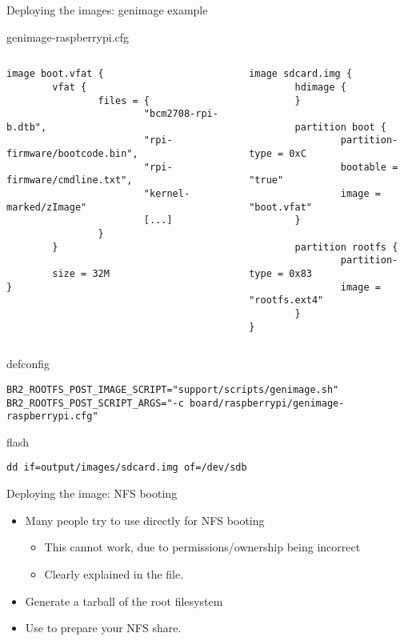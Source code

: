 \begin{frame}[fragile]{Deploying the images: genimage example}
\begin{block}{genimage-raspberrypi.cfg}
\begin{columns}
{\tiny
  \begin{verbatim}
image boot.vfat {
        vfat {
                files = {
                        "bcm2708-rpi-b.dtb",
                        "rpi-firmware/bootcode.bin",
                        "rpi-firmware/cmdline.txt",
                        "kernel-marked/zImage"
                        [...]
                }
        }

        size = 32M
}
\end{verbatim}
}
{\tiny
\begin{verbatim}
image sdcard.img {
        hdimage {
        }

        partition boot {
                partition-type = 0xC
                bootable = "true"
                image = "boot.vfat"
        }

        partition rootfs {
                partition-type = 0x83
                image = "rootfs.ext4"
        }
}
 \end{verbatim}
}
\end{columns}
\end{block}

\begin{block}{defconfig}
{\tiny
  \begin{verbatim}
BR2_ROOTFS_POST_IMAGE_SCRIPT="support/scripts/genimage.sh"
BR2_ROOTFS_POST_SCRIPT_ARGS="-c board/raspberrypi/genimage-raspberrypi.cfg"
\end{verbatim}
}
\end{block}

\begin{block}{flash}
{\tiny
  \begin{verbatim}
dd if=output/images/sdcard.img of=/dev/sdb
\end{verbatim}
}
\end{block}

\end{frame}

\begin{frame}{Deploying the image: NFS booting}
  \begin{itemize}
  \item Many people try to use  directly for NFS booting
    \begin{itemize}
    \item This cannot work, due to permissions/ownership being
      incorrect
    \item Clearly explained in the
       file.
    \end{itemize}
  \item Generate a tarball of the root filesystem
  \item Use  to
    prepare your NFS share.
  \end{itemize}
\end{frame}

